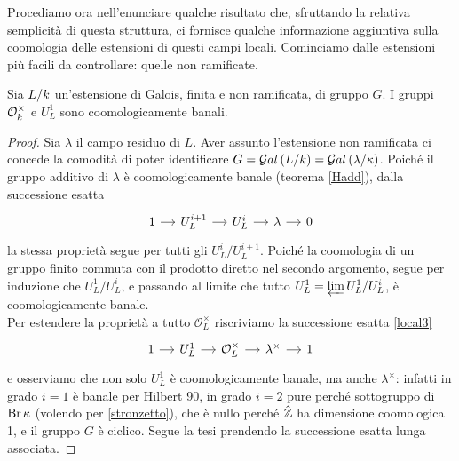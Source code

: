 
Procediamo ora nell'enunciare qualche risultato che, sfruttando la relativa semplicità di questa struttura, ci fornisce qualche informazione aggiuntiva sulla coomologia delle estensioni di questi campi locali. Cominciamo dalle estensioni più facili da controllare: quelle non ramificate.

\begin{theorem}
	Sia $ L/k $ un'estensione di Galois, finita e non ramificata, di gruppo $ G $. I gruppi $ \mathcal{O}_{k}^\times $ e $ U_L^1 $ sono coomologicamente banali.
\end{theorem}
\begin{proof}
	Sia $ \lambda $ il campo residuo di $ L $. Aver assunto l'estensione non ramificata ci concede la comodità di poter identificare $ G = \mathcal{G}al\left( L/k \right) = \mathcal{G}al\left( \lambda / \kappa \right) $. Poiché il gruppo additivo di $ \lambda $ è coomologicamente banale (teorema \ref{Hadd}), dalla successione esatta
	\[\begin{tikzcd}[column sep = small]
	1 \rar
	& U_L^{i+1} \rar
	& U_{L}^i \rar
	& \lambda \rar
	& 0
	\end{tikzcd}\]
	la stessa proprietà segue per tutti gli $ U^i_{L} / U^{i+1}_{L} $.
	Poiché la coomologia di un gruppo finito commuta con il prodotto diretto nel secondo argomento, segue per induzione che $ U^1_{L} / U^{i}_{L} $, e passando al limite che tutto $ U^1_L = \varprojlim U^1_{L} / U^{i}_{L} $, è coomologicamente banale. \\
	
	Per estendere la proprietà a tutto $ \mathcal{O}_{L}^\times $ riscriviamo la successione esatta \ref{local3}
	\begin{equation*}
	\begin{tikzcd}[column sep = small]
	1 \rar
	& U_L^{1} \rar
	& \mathcal{O}_{L}^\times \rar
	& \lambda^\times \rar
	&1
	\end{tikzcd}
	\end{equation*}
	e osserviamo che non solo $  U^1_L $ è coomologicamente banale, ma anche $ \lambda^\times $: infatti in grado $ i = 1 $ è banale per Hilbert 90, in grado $ i = 2 $ pure perché sottogruppo di $ \operatorname{Br} \kappa $ (volendo per \ref{stronzetto}), che è nullo perché $ \hat{\mathbb{Z}} $ ha dimensione coomologica 1, e il gruppo $ G $ è ciclico. Segue la tesi prendendo la successione esatta lunga associata.
\end{proof}

